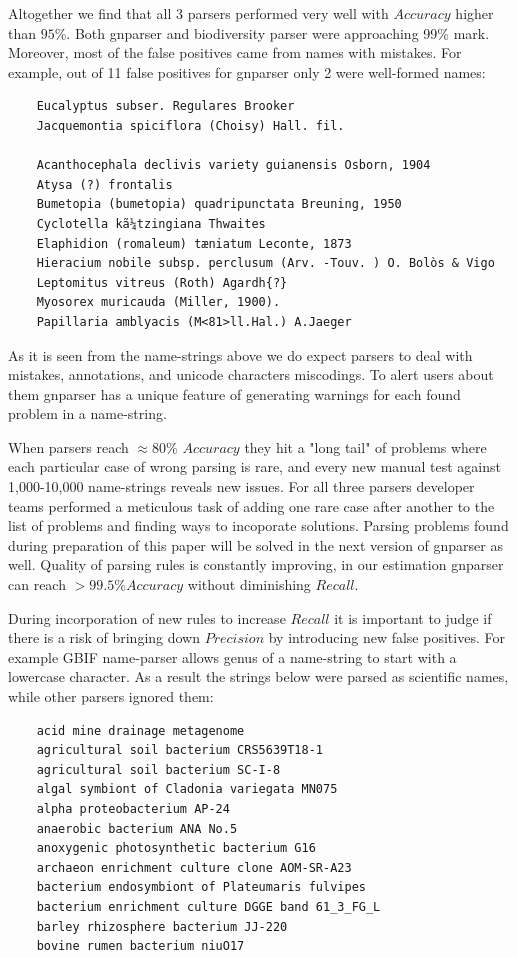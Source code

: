 \documentclass{bmcart}
\begin{document}
Altogether we find that all 3 parsers performed very well with $Accuracy$
higher than $95\%$. Both gnparser and biodiversity parser were approaching
99\% mark. Moreover, most of the false positives came from names with
mistakes. For example, out of 11 false positives for gnparser only 2 were
well-formed names:

\vspace{0.5cm}
\begin{verbatim}
    Eucalyptus subser. Regulares Brooker
    Jacquemontia spiciflora (Choisy) Hall. fil.

    Acanthocephala declivis variety guianensis Osborn, 1904
    Atysa (?) frontalis
    Bumetopia (bumetopia) quadripunctata Breuning, 1950
    Cyclotella kã¼tzingiana Thwaites
    Elaphidion (romaleum) tæniatum Leconte, 1873
    Hieracium nobile subsp. perclusum (Arv. -Touv. ) O. Bolòs & Vigo
    Leptomitus vitreus (Roth) Agardh{?}
    Myosorex muricauda (Miller, 1900).
    Papillaria amblyacis (M<81>ll.Hal.) A.Jaeger
\end{verbatim}
\vspace{0.5cm}

As it is seen from the name-strings above we do expect parsers to deal with
mistakes, annotations, and unicode characters miscodings. To alert users
about them gnparser has a unique feature of generating warnings for each found
problem in a name-string.

When parsers reach $\approx80\%$ $Accuracy$ they hit a "long tail" of problems
where each particular case of wrong parsing is rare, and every new manual test
against 1,000-10,000 name-strings reveals new issues. For all three parsers
developer teams performed a meticulous task of adding one rare case after
another to the list of problems and finding ways to incoporate solutions.
Parsing problems found during preparation of this paper will be solved in the
next version of gnparser as well. Quality of parsing rules is constantly
improving, in our estimation gnparser can reach $> 99.5\% Accuracy$
without diminishing $Recall$.

During incorporation of new rules to increase $Recall$ it is important to
judge if there is a risk of bringing down $Precision$ by introducing new false
positives.  For example GBIF name-parser allows genus of a name-string to
start with a lowercase character. As a result the strings below were parsed as
scientific names, while other parsers ignored them:


\vspace{0.5cm}
\begin{verbatim}
    acid mine drainage metagenome
    agricultural soil bacterium CRS5639T18-1
    agricultural soil bacterium SC-I-8
    algal symbiont of Cladonia variegata MN075
    alpha proteobacterium AP-24
    anaerobic bacterium ANA No.5
    anoxygenic photosynthetic bacterium G16
    archaeon enrichment culture clone AOM-SR-A23
    bacterium endosymbiont of Plateumaris fulvipes
    bacterium enrichment culture DGGE band 61_3_FG_L
    barley rhizosphere bacterium JJ-220
    bovine rumen bacterium niuO17
\end{verbatim}
\vspace{0.5cm}
\end{document}

